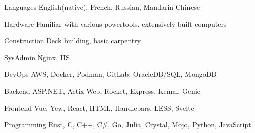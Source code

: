 
\begin{cvskills}
   \cvskill
   {Languages} %
   {English(native), French, Russian, Mandarin Chinese}

   \cvskill
   {Hardware} %
   {Familiar with various powertools, extensively built computers}

   \cvskill
   {Construction} %
   {Deck building, basic carpentry}

   \cvskill
   {SysAdmin} %
   {Nginx, IIS}

   \cvskill
   {DevOps} %
   {AWS, Docker, Podman, GitLab, OracleDB/SQL, MongoDB}

   \cvskill
   {Backend} %
   {ASP.NET, Actix-Web, Rocket, Express, Kemal, Genie}

   \cvskill
   {Frontend} %
   {Vue, Yew, React, HTML, Handlebars, LESS, Svelte}

   \cvskill
   {Programming} %
   {Rust, C, C++, C\#, Go, Julia, Crystal, Mojo, Python, JavaScript}

\end{cvskills}
